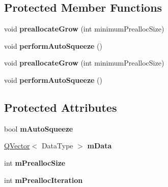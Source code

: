 \subsection*{Protected Member Functions}
\begin{DoxyCompactItemize}
\item 
void {\bfseries preallocate\+Grow} (int minimum\+Prealloc\+Size)\hypertarget{class_q_c_p_data_container_aae8cdb2bcc3b900ec22f26df3e7d67c7}{}\label{class_q_c_p_data_container_aae8cdb2bcc3b900ec22f26df3e7d67c7}

\item 
void {\bfseries perform\+Auto\+Squeeze} ()\hypertarget{class_q_c_p_data_container_a83c25ac14be1c920df85e797ee75c982}{}\label{class_q_c_p_data_container_a83c25ac14be1c920df85e797ee75c982}

\item 
void {\bfseries preallocate\+Grow} (int minimum\+Prealloc\+Size)\hypertarget{class_q_c_p_data_container_aae8cdb2bcc3b900ec22f26df3e7d67c7}{}\label{class_q_c_p_data_container_aae8cdb2bcc3b900ec22f26df3e7d67c7}

\item 
void {\bfseries perform\+Auto\+Squeeze} ()\hypertarget{class_q_c_p_data_container_a83c25ac14be1c920df85e797ee75c982}{}\label{class_q_c_p_data_container_a83c25ac14be1c920df85e797ee75c982}

\end{DoxyCompactItemize}
\subsection*{Protected Attributes}
\begin{DoxyCompactItemize}
\item 
bool {\bfseries m\+Auto\+Squeeze}\hypertarget{class_q_c_p_data_container_aae64c517d64511ad7a81ff8ee7b29147}{}\label{class_q_c_p_data_container_aae64c517d64511ad7a81ff8ee7b29147}

\item 
\hyperlink{class_q_vector}{Q\+Vector}$<$ Data\+Type $>$ {\bfseries m\+Data}\hypertarget{class_q_c_p_data_container_a2ee68eef8975c644d3e43158fe1ba798}{}\label{class_q_c_p_data_container_a2ee68eef8975c644d3e43158fe1ba798}

\item 
int {\bfseries m\+Prealloc\+Size}\hypertarget{class_q_c_p_data_container_a3554d3ad00e69f7ce057efa00ea6f4b2}{}\label{class_q_c_p_data_container_a3554d3ad00e69f7ce057efa00ea6f4b2}

\item 
int {\bfseries m\+Prealloc\+Iteration}\hypertarget{class_q_c_p_data_container_ab2115bf023c29691f441eaf1889de84a}{}\label{class_q_c_p_data_container_ab2115bf023c29691f441eaf1889de84a}

\end{DoxyCompactItemize}
